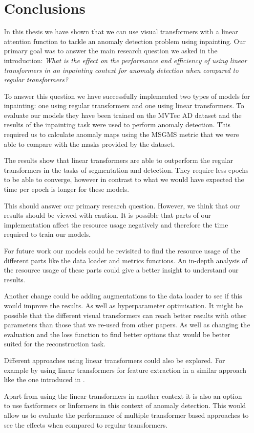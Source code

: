 \chapter{Conclusions}\label{ch:conclusions}

In this thesis we have shown that we can use visual transformers with a linear attention function to tackle an anomaly detection problem using inpainting. Our primary goal was to answer the main research question we asked in the introduction: \textsl{What is the effect on the performance and efficiency of using linear transformers in an inpainting context for anomaly detection when compared to regular transformers?}

To answer this question we have successfully implemented two types of models for inpainting: one using regular transformers and one using linear transformers. To evaluate our models they have been trained on the MVTec AD dataset and the results of the inpainting task were used to perform anomaly detection. This required us to calculate anomaly maps using the MSGMS metric that we were able to compare with the masks provided by the dataset.

The results show that linear transformers are able to outperform the regular transformers in the tasks of segmentation and detection. They require less epochs to be able to converge, however in contrast to what we would have expected the time per epoch is longer for these models.

This should answer our primary research question. However, we think that our results should be viewed with caution. It is possible that parts of our implementation affect the resource usage negatively and therefore the time required to train our models.

For future work our models could be revisited to find the resource usage of the different parts like the data loader and metrics functions. An in-depth analysis of the resource usage of these parts could give a better insight to understand our results.

Another change could be adding augmentations to the data loader to see if this would improve the results. As well as hyperparameter optimisation. It might be possible that the different visual transformers can reach better results with other parameters than those that we re-used from other papers. As well as changing the evaluation and the loss function to find better options that would be better suited for the reconstruction task.

Different approaches using linear transformers could also be explored. For example by using linear transformers for feature extraction in a similar approach like the one introduced in \cite{yu_fastflow_2021}.

Apart from using the linear transformers in another context it is also an option to use fastformers \cite{wu_fastformer_2021} or linformers \cite{wang_linformer_2020} in this context of anomaly detection. This would allow us to evaluate the performance of multiple transformer based approaches to see the effects when compared to regular transformers.